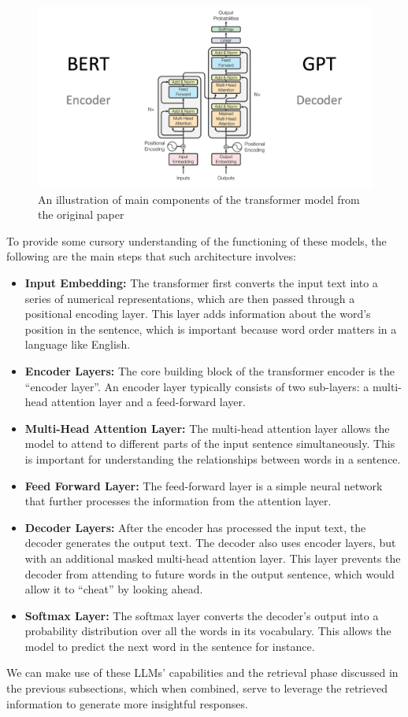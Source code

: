 \begin{figure}[H]
    \centering
    \includegraphics[width=\linewidth]{./figures/The-Transformer-model-architecture.png}
    \caption{An illustration of main components of the transformer model from the original paper \cite{transformersarch}}
\end{figure}
To provide some cursory understanding of the functioning of these models, the following are the main steps that such architecture involves:
\begin{itemize}
    \item \textbf{Input Embedding:} The transformer first converts the input text into a series of numerical representations,  which are then passed through a positional encoding layer. This layer adds information about the word’s position in the sentence, which is important because word order matters in a language like English.
    \item \textbf{Encoder Layers:} The core building block of the transformer encoder is the “encoder layer”.  An encoder layer typically consists of two sub-layers: a multi-head attention layer and a feed-forward layer.
    \item \textbf{Multi-Head Attention Layer:} The multi-head attention layer allows the model to attend to different parts of the input sentence simultaneously. This is important for understanding the relationships between words in a sentence.
    \item \textbf{Feed Forward Layer:} The feed-forward layer is a simple neural network that further processes the information from the attention layer.
    \item \textbf{Decoder Layers:} After the encoder has processed the input text, the decoder generates the output text. The decoder also uses encoder layers, but with an additional masked multi-head attention layer. This layer prevents the decoder from attending to future words in the output sentence, which would allow it to “cheat” by looking ahead.
    \item \textbf{Softmax Layer:} The softmax layer converts the decoder's output into a probability distribution over all the words in its vocabulary. This allows the model to predict the next word in the sentence for instance.
\end{itemize}
We can make use of these LLMs' capabilities and the retrieval phase discussed in the previous subsections, which when combined, serve to leverage the retrieved information to generate more insightful responses.
